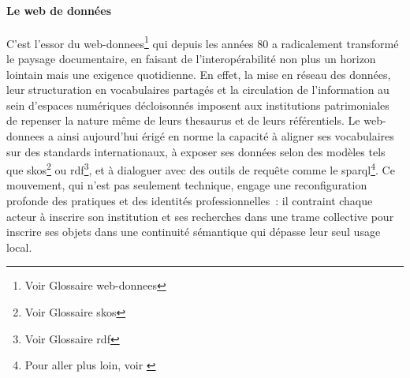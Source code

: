 \paragraph*{Le web de données}
C'est l'essor du \gls{web-donnees}\footnote{Voir Glossaire \gls{web-donnees}} qui depuis les années 80 a radicalement transformé le paysage documentaire, en faisant de l'interopérabilité non plus un horizon lointain mais une exigence quotidienne. En effet, la mise en réseau des données, leur structuration en vocabulaires partagés et la circulation de l'information au sein d'espaces numériques décloisonnés imposent aux institutions patrimoniales de repenser la nature même de leurs \gls{thesaurus} et de leurs référentiels. Le \gls{web-donnees} a ainsi aujourd'hui érigé en norme la capacité à aligner ses vocabulaires sur des standards internationaux, à exposer ses données selon des modèles tels que \gls{skos}\footnote{Voir Glossaire \gls{skos}} ou \gls{rdf}\footnote{Voir Glossaire \gls{rdf}}, et à dialoguer avec des outils de requête comme le \ac{sparql}\footnote{Pour aller plus loin, voir \cite{bermesVersNouveauxCatalogues2016, bermesCasLierDonnees2013a,lenartSKOSLangageRepresentation2007,perrinConsoliderEnrichirSes2020}}. Ce mouvement, qui n'est pas seulement technique, engage une reconfiguration profonde des pratiques et des identités professionnelles~: il contraint chaque acteur à inscrire son institution et ses recherches dans une trame collective pour inscrire ses objets dans une continuité sémantique qui dépasse leur seul usage local.

